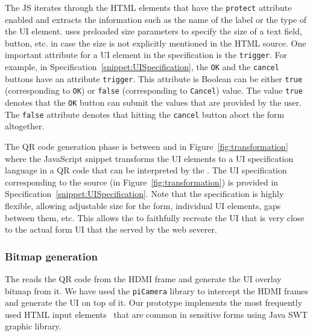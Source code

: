 The \name JS iterates through the HTML elements that have the \texttt{protect} attribute enabled and extracts the information such as the name of the label or the type of the UI element. \device uses preloaded size parameters to specify the size of a text field, button, etc. in case the size is not explicitly mentioned in the HTML source. One important attribute for a UI element in the specification is the \texttt{trigger}. For example, in Specification~\ref{snippet:UISpecification}, the \texttt{OK} and the \texttt{cancel} buttons have an attribute \texttt{trigger}. This attribute is Boolean can be either \texttt{true} (corresponding to \texttt{OK}) or \texttt{false} (corresponding to \texttt{Cancel}) value. The value \texttt{true} denotes that the \texttt{OK} button can submit the values that are provided by the user. The \texttt{false} attribute denotes that hitting the \texttt{cancel} button abort the form altogether. 

The QR code generation phase is between \one and \two in Figure~\ref{fig:transformation} where the \name JavaScript snippet transforms the UI elements to a UI specification language in a QR code that can be interpreted by the \device. The UI specification corresponding to the \html source (in Figure~\ref{fig:transformation}) is provided in Specification~\ref{snippet:UISpecification}. Note that the specification is highly flexible, allowing adjustable size for the form, individual UI elements, gaps between them, etc. This allows the \device to faithfully recreate the UI that is very close to the actual form UI that the served by the web severer. 

\subsubsection{Bitmap generation}
\label{sec:prototype:impl:bitmap}
%
The \device reads the QR code from the HDMI frame and generate the UI overlay bitmap from it. We have used the \texttt{piCamera} library to intercept the HDMI frames and generate the UI on top of it. Our \name prototype implements the most frequently used HTML input elements~\cite{html_elements} that are common in sensitive forms using Java SWT graphic library. 


